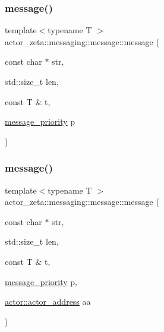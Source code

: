 \mbox{\label{classactor__zeta_1_1messaging_1_1message_a0428ac91ee6cdf4b4a99a2f7c262cc0c}} 
\subsubsection{\texorpdfstring{message()}{message()}\hspace{0.1cm}{\footnotesize\ttfamily [10/11]}}
{\footnotesize\ttfamily template$<$typename T $>$ \\
actor\+\_\+zeta\+::messaging\+::message\+::message (\begin{DoxyParamCaption}\item[{const char $\ast$}]{str,  }\item[{std\+::size\+\_\+t}]{len,  }\item[{const T \&}]{t,  }\item[{\hyperlink{namespaceactor__zeta_1_1messaging_a1b4c4b3ab625eb033c15da4fbe9c4a89}{message\+\_\+priority}}]{p }\end{DoxyParamCaption})\hspace{0.3cm}{\ttfamily [inline]}}

\mbox{\label{classactor__zeta_1_1messaging_1_1message_a145a2691247f874ab57ff964512631c1}} 
\subsubsection{\texorpdfstring{message()}{message()}\hspace{0.1cm}{\footnotesize\ttfamily [11/11]}}
{\footnotesize\ttfamily template$<$typename T $>$ \\
actor\+\_\+zeta\+::messaging\+::message\+::message (\begin{DoxyParamCaption}\item[{const char $\ast$}]{str,  }\item[{std\+::size\+\_\+t}]{len,  }\item[{const T \&}]{t,  }\item[{\hyperlink{namespaceactor__zeta_1_1messaging_a1b4c4b3ab625eb033c15da4fbe9c4a89}{message\+\_\+priority}}]{p,  }\item[{\hyperlink{classactor__zeta_1_1actor_1_1actor__address}{actor\+::actor\+\_\+address}}]{aa }\end{DoxyParamCaption})\hspace{0.3cm}{\ttfamily [inline]}}



